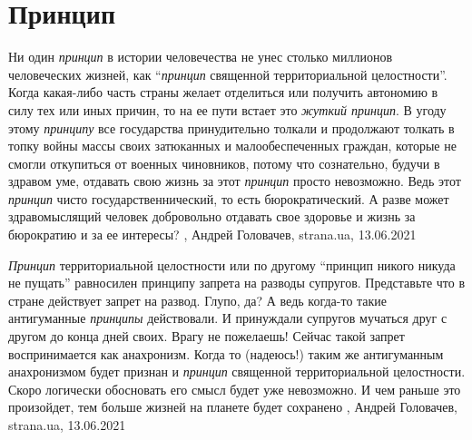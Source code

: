  
 
 
 
 
\chapter{Принцип}

Ни один \emph{принцип} в истории человечества не унес столько миллионов
человеческих жизней, как \enquote{\emph{принцип} священной территориальной
целостности}. Когда какая-либо часть страны желает отделиться или получить
автономию в силу тех или иных причин, то на ее пути встает это \emph{жуткий
принцип}.  В угоду этому \emph{принципу} все государства принудительно толкали
и продолжают толкать в топку войны массы своих затюканных и малообеспеченных
граждан, которые не смогли откупиться от военных чиновников, потому что
сознательно, будучи в здравом уме, отдавать свою жизнь за этот \emph{принцип}
просто невозможно.  Ведь этот \emph{принцип} чисто государственнический, то
есть бюрократический. А разве может здравомыслящий человек добровольно отдавать
свое здоровье и жизнь за бюрократию и за ее интересы?
, 
Андрей Головачев, strana.ua, 13.06.2021

\emph{Принцип} территориальной целостности или по другому \enquote{принцип никого никуда не
пущать} равносилен принципу запрета на разводы супругов. Представьте что в
стране действует запрет на развод. Глупо, да? А ведь когда-то такие
антигуманные \emph{принципы} действовали. И принуждали супругов мучаться друг с другом
до конца дней своих. Врагу не пожелаешь! Сейчас такой запрет воспринимается как
анахронизм.  Когда то (надеюсь!) таким же антигуманным анахронизмом будет
признан и \emph{принцип} священной территориальной целостности. Скоро логически
обосновать его смысл будет уже невозможно. И чем раньше это произойдет, тем
больше жизней на планете будет сохранено
, 
Андрей Головачев, strana.ua, 13.06.2021

